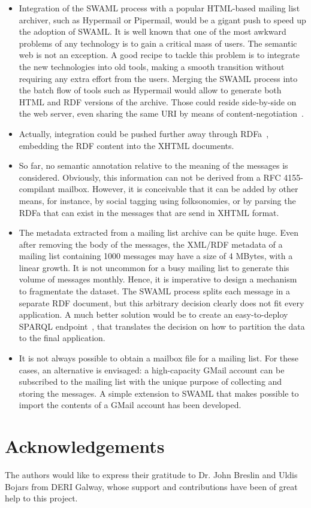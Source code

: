\documentclass{llncs}
\begin{document}
\begin{itemize}
  \item Integration of the SWAML process with a popular HTML-based
        mailing list archiver, such as Hypermail or Pipermail, would be
        a gigant push to speed up the adoption of SWAML. It is well
        known that one of the most awkward problems of any technology
        is to gain a critical mass of users. The semantic web is not
        an exception. A good recipe to tackle this problem is to
        integrate the new technologies into old tools, making
        a smooth transition without requiring any extra effort from
        the users. Merging the SWAML process into the batch flow of
        tools such as Hypermail would allow to generate both
        HTML and RDF versions of the archive. Those could reside
        side-by-side on the web server, even sharing the same URI
        by means of content-negotiation~\cite{Recipes}.
  \item Actually, integration could be pushed further away through
        RDFa~\cite{Birbeck2006}, embedding the RDF content into the
        XHTML documents.
  \item So far, no semantic annotation relative to the meaning of
        the messages is considered. Obviously, this information can not
        be derived from a RFC 4155-compilant mailbox.
        However, it is
        conceivable that it can be added by other means, for instance,
        by social tagging using folksonomies, or by parsing the RDFa
        that can exist in the messages that are send in XHTML format.
  \item The metadata extracted from a mailing list archive can be
        quite huge. Even after removing the body of the messages, the
        XML/RDF metadata of a mailing list containing 1000 messages may
        have a size of 4 MBytes, with a linear growth. It is not uncommon
        for a busy mailing list to generate this volume of messages
        monthly. Hence, it is imperative to design a mechanism to
        fragmentate the dataset. The SWAML process splits each message
        in a separate RDF document, but this arbitrary decision clearly
        does not fit every application. A much better solution would be to
        create an easy-to-deploy SPARQL endpoint~\cite{SPARQLProtocol},
        that translates the
        decision on how to partition the data to the final application.
  \item It is not always possible to obtain a mailbox file for a mailing
        list. For these cases, an alternative is envisaged: a high-capacity
        GMail account can be subscribed to the mailing list with the unique
        purpose of collecting and storing the messages. A simple extension
        to SWAML that makes possible to import the contents of a GMail
        account has been developed.

\end{itemize}

\section*{Acknowledgements}

The authors would like to express their gratitude to Dr. John Breslin and
Uldis Bojars from DERI Galway, whose support and contributions have been of 
great help to this project.



%
\end{document}
